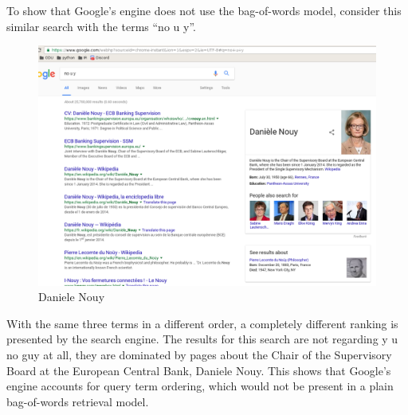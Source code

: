 \clearpage

To show that Google's engine does not use the bag-of-words model, consider this similar search with the terms ``no u y''.

\begin{figure}[H]
\centering
\label{fig:nouy}
\includegraphics[scale=.25]{q11.2/nouy.png}
\caption{Daniele Nouy}
\end{figure}

With the same three terms in a different order, a completely different ranking is presented by the search engine.  The results for this search are not regarding y u no guy at all, they are dominated by pages about the Chair of the Supervisory Board at the European Central Bank, Daniele Nouy.  This shows that Google's engine accounts for query term ordering, which would not be present in a plain bag-of-words retrieval model.
